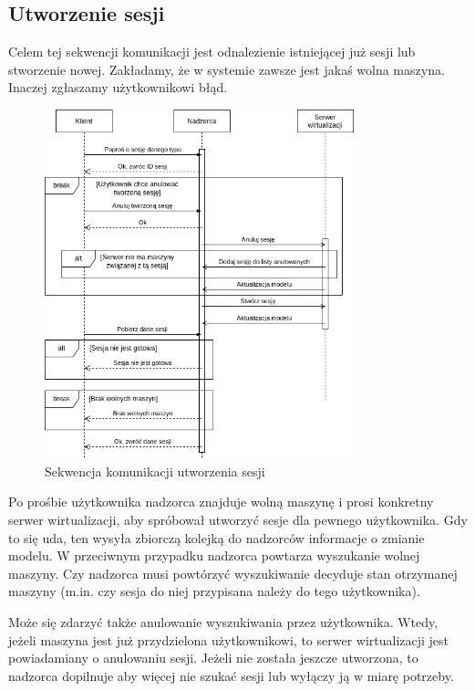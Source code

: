 \documentclass[../opis-rozwiazania.tex]{subfiles}
\begin{document}
\label{communication-sec}

\subsection{Utworzenie sesji}

Celem tej sekwencji komunikacji jest odnalezienie istniejącej już sesji lub stworzenie nowej.
Zakładamy, że w systemie zawsze jest jakaś wolna maszyna.
Inaczej zgłaszamy użytkownikowi błąd.

\begin{figure}[H]
  \centering
  \includegraphics[width=0.8\textwidth]{../diagrams/sequence_diagrams/tworzenie_sesji.png}
  \caption{Sekwencja komunikacji utworzenia sesji}
  \label{figure:diagrams:sequence_diagrams:tworzenie_sesji}
\end{figure}

Po prośbie użytkownika nadzorca znajduje wolną maszynę i prosi konkretny serwer wirtualizacji, aby spróbował utworzyć sesje dla pewnego użytkownika.
Gdy to się uda, ten wysyła zbiorczą kolejką do nadzorców informacje o zmianie modelu.
W przeciwnym przypadku nadzorca powtarza wyszukanie wolnej maszyny.
Czy nadzorca musi powtórzyć wyszukiwanie decyduje stan otrzymanej maszyny (m.in. czy sesja do niej przypisana należy do tego użytkownika).

Może się zdarzyć także anulowanie wyszukiwania przez użytkownika.
Wtedy, jeżeli maszyna jest już przydzielona użytkownikowi, to serwer wirtualizacji jest powiadamiany o anulowaniu sesji.
Jeżeli nie została jeszcze utworzona, to nadzorca dopilnuje aby więcej nie szukać sesji lub wyłączy ją w miarę potrzeby.
\end{document}
